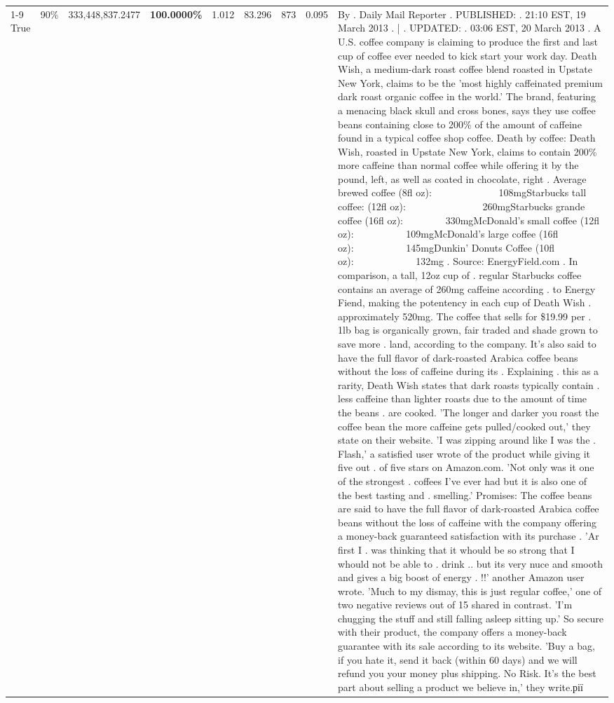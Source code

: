 \begin{table}[H]
{\begin{tabular}{lllrlllll}
\cline{1-9} \cline{2-9}
True & 90\% & 333,448,837.2477 & \bfseries \color{red} 100.0000\% & 1.012 & 83.296 & 873 & 0.095 & By . Daily Mail Reporter . PUBLISHED: . 21:10 EST, 19 March 2013 . | . UPDATED: . 03:06 EST, 20 March 2013 . A U.S. coffee company is claiming to produce the first and last cup of coffee ever needed to kick start your work day. Death Wish, a medium-dark roast coffee blend roasted in Upstate New York, claims to be the 'most highly caffeinated premium dark roast organic coffee in the world.' The brand, featuring a menacing black skull and cross bones, says they use coffee beans containing close to 200\% of the amount of caffeine found in a typical coffee shop coffee. Death by coffee: Death Wish, roasted in Upstate New York, claims to contain 200\% more caffeine than normal coffee while offering it by the pound, left, as well as coated in chocolate, right . Average brewed coffee (8fl oz):              108mgStarbucks tall coffee: (12fl oz):                260mgStarbucks grande coffee (16fl oz):         330mgMcDonald's small coffee (12fl oz):           109mgMcDonald's large coffee (16fl oz):           145mgDunkin' Donuts Coffee (10fl oz):             132mg . Source: EnergyField.com . In comparison, a tall, 12oz cup of . regular Starbucks coffee contains an average of 260mg caffeine according . to Energy Fiend, making the potentency in each cup of Death Wish . approximately 520mg. The coffee that sells for \$19.99 per . 1lb bag is organically grown, fair traded and shade grown to save more . land, according to the company. It's also said to have the full flavor of dark-roasted Arabica coffee beans without the loss of caffeine during its . Explaining . this as a rarity, Death Wish states that dark roasts typically contain . less caffeine than lighter roasts due to the amount of time the beans . are cooked. 'The longer and darker you roast the coffee bean the more caffeine gets pulled/cooked out,' they state on their website. 'I was zipping around like I was the . Flash,' a satisfied user wrote of the product while giving it five out . of five stars on Amazon.com. 'Not only was it one of the strongest . coffees I've ever had but it is also one of the best tasting and . smelling.’ Promises: The coffee beans are said to have the full flavor of dark-roasted Arabica coffee beans without the loss of caffeine with the company offering a money-back guaranteed satisfaction with its purchase . 'Ar first I . was thinking that it whould be so strong that I whould not be able to . drink .. but its very nuce and smooth and gives a big boost of energy . !!' another Amazon user wrote. 'Much to my dismay, this is just regular coffee,' one of two negative reviews out of 15 shared in contrast. 'I'm chugging the stuff and still falling asleep sitting up.' So secure with their product, the company offers a money-back guarantee with its sale according to its website. 'Buy a bag, if you hate it, send it back (within 60 days) and we will refund you your money plus shipping. No Risk. It’s the best part about selling a product we believe in,' they write.рії \\

\end{tabular}}
\end{table}

